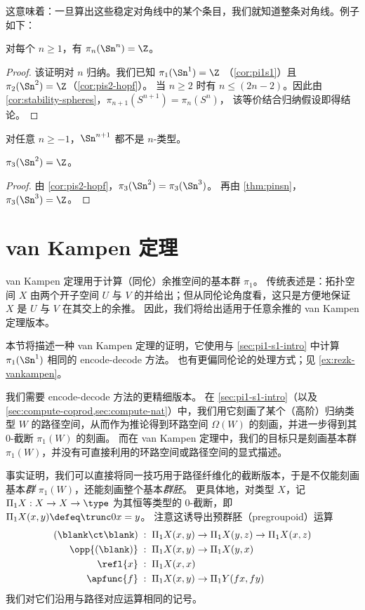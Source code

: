 这意味着：一旦算出这些稳定对角线中的某个条目，我们就知道整条对角线。例子如下：
\begin{thm}\label{thm:pinsn}
对每个 $n\geq 1$，有 $\pi_n(\Sn^n)=\Z$。
\end{thm}

\begin{proof}
该证明对 $n$ 归纳。我们已知 $\pi_1(\Sn ^1) = \Z$
（\cref{cor:pi1s1}）且 $\pi_2(\Sn ^2) = \Z$（\cref{cor:pis2-hopf}）。
当 $n \ge 2$ 时有 $n \le (2n - 2)$。因此由
\cref{cor:stability-spheres}，$\pi_{n+1}(S^{n+1}) = \pi_{n}(S^{n})$，
该等价结合归纳假设即得结论。
\end{proof}

\begin{cor}
  对任意 $n\ge -1$，$\Sn^{n+1}$ 都不是 $n$-类型。
\end{cor}

\begin{cor}\label{thm:pi3s2}
  $\pi_3(\Sn^2)=\Z$。
\end{cor}
\begin{proof}
  由 \cref{cor:pis2-hopf}，$\pi_3(\Sn^2) = \pi_3(\Sn^3)$。
  再由 \cref{thm:pinsn}，$\pi_3(\Sn^3) = \Z$。
\end{proof}
\section{van Kampen 定理}
\label{sec:van-kampen}

%
%

%
van Kampen 定理用于计算（同伦）余推空间的基本群 $\pi_1$。
传统表述是：拓扑空间 $X$ 由两个开子空间 $U$ 与 $V$ 的并给出；但从同伦论角度看，这只是方便地保证 $X$ 是 $U$ 与 $V$ 在其交上的余推。
因此，我们将给出适用于任意余推的 van Kampen 定理版本。

本节将描述一种 van Kampen 定理的证明，它使用与 \cref{sec:pi1-s1-intro} 中计算 $\pi_1(\Sn^1)$ 相同的 encode-decode 方法。
也有更偏同伦论的处理方式；见 \cref{ex:rezk-vankampen}。

我们需要 encode-decode 方法的更精细版本。
在 \cref{sec:pi1-s1-intro}（以及 \cref{sec:compute-coprod,sec:compute-nat}）中，我们用它刻画了某个（高阶）归纳类型 $W$ 的路径空间，从而作为推论得到环路空间 $\Omega(W)$ 的刻画，并进一步得到其 0-截断 $\pi_1(W)$ 的刻画。
而在 van Kampen 定理中，我们的目标只是刻画基本群 $\pi_1(W)$，并没有可直接利用的环路空间或路径空间的显式描述。

事实证明，我们可以直接将同一技巧用于路径纤维化的截断版本，于是不仅能刻画基本\emph{群} $\pi_1(W)$，还能刻画整个基本\emph{群胚}。
%
更具体地，对类型 $X$，记 $\Pi_1 X: X\to X\to \type$ 为其恒等类型的 $0$-截断，即 $\Pi_1 X(x,y) \defeq \trunc0{x=y}$。
注意这诱导出预群胚（pregroupoid）运算
\begin{align*}
  (\blank\ct\blank) &\;:\; \Pi_1X(x,y) \to \Pi_1X(y,z) \to \Pi_1X(x,z)\\
  \opp{(\blank)} &\;:\; \Pi_1X(x,y) \to \Pi_1X(y,x)\\
  \refl{x} &\;:\; \Pi_1X(x,x)\\
  \apfunc{f} &\;:\; \Pi_1X(x,y) \to \Pi_1Y(fx,fy)
\end{align*}
我们对它们沿用与路径对应运算相同的记号。


